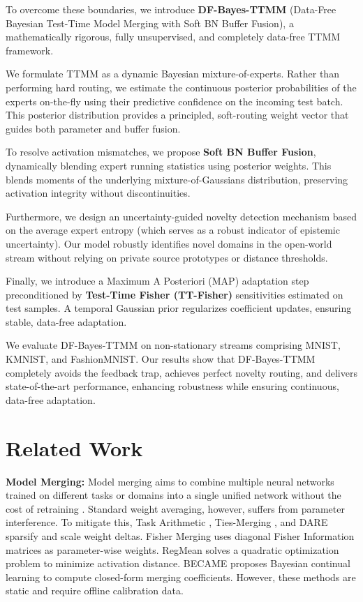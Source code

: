 \documentclass{article}
\theoremstyle{plain}
\theoremstyle{definition}
\theoremstyle{remark}
\begin{document}
To overcome these boundaries, we introduce \textbf{DF-Bayes-TTMM} (Data-Free Bayesian Test-Time
Model Merging with Soft BN Buffer Fusion), a mathematically rigorous, fully unsupervised, and
completely data-free TTMM framework.

We formulate TTMM as a dynamic Bayesian mixture-of-experts. Rather than performing hard routing, we
estimate the continuous posterior probabilities of the experts on-the-fly using their predictive
confidence on the incoming test batch. This posterior distribution provides a principled,
soft-routing weight vector that guides both parameter and buffer fusion.

To resolve activation mismatches, we propose \textbf{Soft BN Buffer Fusion}, dynamically blending
expert running statistics using posterior weights. This blends moments of the underlying
mixture-of-Gaussians distribution, preserving activation integrity without discontinuities.

Furthermore, we design an uncertainty-guided novelty detection mechanism based on the average
expert entropy (which serves as a robust indicator of epistemic uncertainty). Our model robustly
identifies novel domains in the open-world stream without relying on private source prototypes or
distance thresholds.

Finally, we introduce a Maximum A Posteriori (MAP) adaptation step preconditioned by
\textbf{Test-Time Fisher (TT-Fisher)} sensitivities estimated on test samples. A temporal Gaussian
prior regularizes coefficient updates, ensuring stable, data-free adaptation.

We evaluate DF-Bayes-TTMM on non-stationary streams comprising MNIST, KMNIST, and FashionMNIST. Our
results show that DF-Bayes-TTMM completely avoids the feedback trap, achieves perfect novelty
routing, and delivers state-of-the-art performance, enhancing robustness while ensuring continuous,
data-free adaptation.

\section{Related Work}\vspace{-0.1in}
\label{sec:related_work}

\textbf{Model Merging:} Model merging aims to combine multiple neural networks trained on different
tasks or domains into a single unified network without the cost of retraining \cite{Wortsman2022,
Ainsworth2023, Jordan2022}. Standard weight averaging, however, suffers from parameter interference.
To mitigate this, Task Arithmetic \cite{Ilharco2023}, Ties-Merging \cite{Yadav2023}, and DARE
\cite{Yu2023} sparsify and scale weight deltas. Fisher Merging \cite{Matena2022} uses diagonal
Fisher Information matrices as parameter-wise weights. RegMean \cite{Jin2023} solves a quadratic
optimization problem to minimize activation distance. BECAME \cite{Li2025} proposes Bayesian
continual learning to compute closed-form merging coefficients. However, these methods are static
and require offline calibration data.
\end{document}
